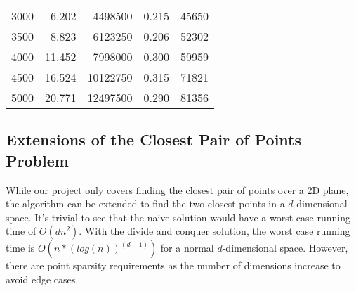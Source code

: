 \documentclass[12pt]{report}
\begin{document}
\begin{table}[hbt!]
\begin{tabular}{lrrrr}
3000                                 & 6.202                                & 4498500                               & 0.215                                & 45650                                 \\
3500                                 & 8.823                                & 6123250                               & 0.206                                & 52302                                 \\
4000                                 & 11.452                               & 7998000                               & 0.300                                & 59959                                 \\
4500                                 & 16.524                               & 10122750                              & 0.315                                & 71821                                 \\
5000                                 & 20.771                               & 12497500                              & 0.290                                & 81356                                
\end{tabular}
\end{table}


\FloatBarrier
\subsection*{Extensions of the Closest Pair of Points Problem}
While our project only covers finding the closest pair of points over a 2D plane, the algorithm can 
be extended to find the t​​​​​​​​​wo closest points in a $d$-dimensional space. It's trivial to see that the 
naive solution would have a worst case running time of $O(dn^2)$. With the divide and conquer solution, 
the worst case running time is $O(n * (log(n))^{(d-1)})$ for a normal $d$-dimensional space. However, there 
are point sparsity requirements as the number of dimensions increase to avoid ed​ge cases.
\end{document}
